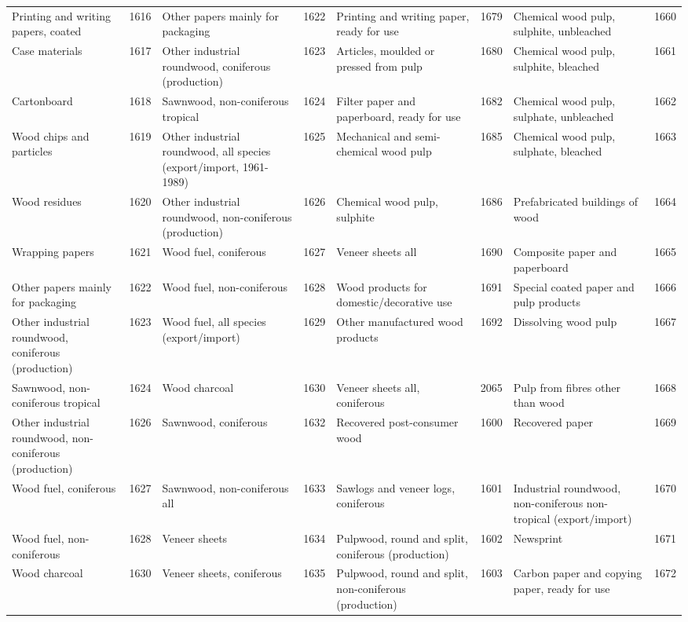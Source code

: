 \documentclass[
]{book}
\begin{document}
\begin{table}
\begin{tabular}[t]{lrlrlrlr}
\addlinespace
Printing and writing papers, coated & 1616 & Other papers mainly for packaging & 1622 & Printing and writing paper, ready for use & 1679 & Chemical wood pulp, sulphite, unbleached & 1660\\
Case materials & 1617 & Other industrial roundwood, coniferous (production) & 1623 & Articles, moulded or pressed from pulp & 1680 & Chemical wood pulp, sulphite, bleached & 1661\\
Cartonboard & 1618 & Sawnwood, non-coniferous tropical & 1624 & Filter paper and paperboard, ready for use & 1682 & Chemical wood pulp, sulphate, unbleached & 1662\\
Wood chips and particles & 1619 & Other industrial roundwood, all species (export/import, 1961-1989) & 1625 & Mechanical and semi-chemical wood pulp & 1685 & Chemical wood pulp, sulphate, bleached & 1663\\
Wood residues & 1620 & Other industrial roundwood, non-coniferous (production) & 1626 & Chemical wood pulp, sulphite & 1686 & Prefabricated buildings of wood & 1664\\
\addlinespace
Wrapping papers & 1621 & Wood fuel, coniferous & 1627 & Veneer sheets all & 1690 & Composite paper and paperboard & 1665\\
Other papers mainly for packaging & 1622 & Wood fuel, non-coniferous & 1628 & Wood products for domestic/decorative use & 1691 & Special coated paper and pulp products & 1666\\
Other industrial roundwood, coniferous (production) & 1623 & Wood fuel, all species (export/import) & 1629 & Other manufactured wood products & 1692 & Dissolving wood pulp & 1667\\
Sawnwood, non-coniferous tropical & 1624 & Wood charcoal & 1630 & Veneer sheets all, coniferous & 2065 & Pulp from fibres other than wood & 1668\\
Other industrial roundwood, non-coniferous (production) & 1626 & Sawnwood, coniferous & 1632 & Recovered post-consumer wood & 1600 & Recovered paper & 1669\\
\addlinespace
Wood fuel, coniferous & 1627 & Sawnwood, non-coniferous all & 1633 & Sawlogs and veneer logs, coniferous & 1601 & Industrial roundwood, non-coniferous non-tropical (export/import) & 1670\\
Wood fuel, non-coniferous & 1628 & Veneer sheets & 1634 & Pulpwood, round and split, coniferous (production) & 1602 & Newsprint & 1671\\
Wood charcoal & 1630 & Veneer sheets, coniferous & 1635 & Pulpwood, round and split, non-coniferous (production) & 1603 & Carbon paper and copying paper, ready for use & 1672\\

\end{tabular}
\end{table}
\end{document}

